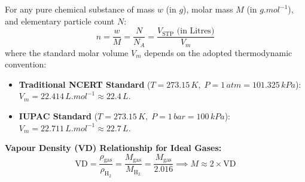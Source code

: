 \documentclass[10pt,twoside,openright]{book}
\begin{document}
\begin{formulabox}
For any pure chemical substance of mass $w$ (in $\si{g}$), molar mass $M$ (in $\si{g.mol^{-1}}$), and elementary particle count $N$:
\begin{equation}
  n = \frac{w}{M} = \frac{N}{N_A} = \frac{V_{\text{STP}}\text{ (in Litres)}}{V_m}
\end{equation}
where the standard molar volume $V_m$ depends on the adopted thermodynamic convention:
\begin{itemize}
  \item \textbf{Traditional NCERT Standard} ($T = 273.15\,\si{K},\; P = 1\,\si{atm} = 101.325\,\si{kPa}$):\\
  $V_m = 22.414\,\si{L.mol^{-1}} \approx 22.4\,\si{L}$.
  \item \textbf{IUPAC Standard} ($T = 273.15\,\si{K},\; P = 1\,\si{bar} = 100\,\si{kPa}$):\\
  $V_m = 22.711\,\si{L.mol^{-1}} \approx 22.7\,\si{L}$.
\end{itemize}
\textbf{Vapour Density (VD) Relationship for Ideal Gases:}
\begin{equation}
  \text{VD} = \frac{\rho_{\text{gas}}}{\rho_{\text{H}_2}} = \frac{M_{\text{gas}}}{M_{\text{H}_2}} = \frac{M_{\text{gas}}}{2.016} \implies M \approx 2 \times \text{VD}
\end{equation}
\end{formulabox}
\end{document}
